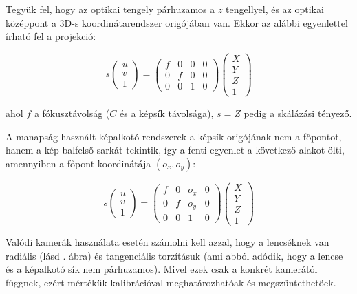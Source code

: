 Tegyük fel, hogy az optikai tengely párhuzamos a $z$ tengellyel, és az optikai középpont a 3D-s koordinátarendszer origójában van. Ekkor az alábbi egyenlettel írható fel a projekció:

\[s \left(\begin{array}{c}
u \\ 
v \\
1
\end{array}\right) = \left(\begin{array}{cccc}
f & 0 & 0 & 0 \\ 
0 & f & 0 & 0\\
0 & 0 & 1 & 0
\end{array}\right) \left(\begin{array}{c}
X \\ 
Y \\
Z \\
1
\end{array}\right)\]

ahol $f$ a fókusztávolság ($C$ és a képsík távolsága), $s = Z$ pedig a skálázási tényező.

A manapság használt képalkotó rendszerek a képsík origójának nem a főpontot, hanem a kép balfelső sarkát tekintik, így a fenti egyenlet a következő  alakot ölti, amennyiben a főpont koordinátája $(o_x, o_y)$:

\[s \left(\begin{array}{c}
u \\ 
v \\
1
\end{array}\right) = \left(\begin{array}{cccc}
f & 0 & o_x & 0 \\ 
0 & f & o_y & 0 \\
0 & 0 & 1 & 0
\end{array}\right) \left(\begin{array}{c}
X \\ 
Y \\
Z \\
1
\end{array}\right)\]

Valódi kamerák használata esetén számolni kell azzal, hogy a lencséknek van radiális (lásd . ábra) és tangenciális torzításuk (ami abból adódik, hogy a lencse és a képalkotó sík nem párhuzamos). Mivel ezek csak a konkrét kamerától függnek, ezért mértékük kalibrációval meghatározhatóak és megszüntethetőek. 

